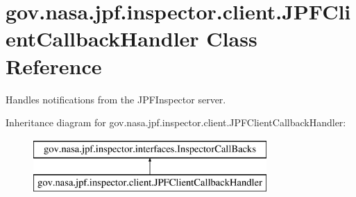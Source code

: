 \hypertarget{classgov_1_1nasa_1_1jpf_1_1inspector_1_1client_1_1_j_p_f_client_callback_handler}{}\section{gov.\+nasa.\+jpf.\+inspector.\+client.\+J\+P\+F\+Client\+Callback\+Handler Class Reference}
\label{classgov_1_1nasa_1_1jpf_1_1inspector_1_1client_1_1_j_p_f_client_callback_handler}


Handles notifications from the J\+P\+F\+Inspector server.  


Inheritance diagram for gov.\+nasa.\+jpf.\+inspector.\+client.\+J\+P\+F\+Client\+Callback\+Handler\+:\begin{figure}[H]
\begin{center}
\leavevmode
\includegraphics[height=2.000000cm]{classgov_1_1nasa_1_1jpf_1_1inspector_1_1client_1_1_j_p_f_client_callback_handler}
\end{center}
\end{figure}
